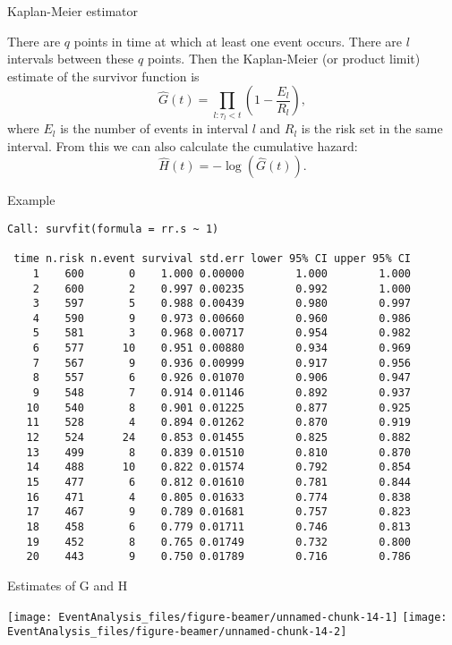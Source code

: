 \documentclass[10pt,ignorenonframetext,]{beamer}
\begin{document}
\begin{frame}{Kaplan-Meier estimator}

There are \(q\) points in time at which at least one event occurs. There
are \(l\) intervals between these \(q\) points. Then the Kaplan-Meier
(or product limit) estimate of the survivor function is \[
\widehat{G}(t) = \prod_{l:\tau_l<t} \left(1 - \frac{E_l}{R_l}\right),
\] where \(E_l\) is the number of events in interval \(l\) and \(R_l\)
is the risk set in the same interval. From this we can also calculate
the cumulative hazard: \[
\widehat{H}(t) = -\log\left(\widehat{G}(t)\right).
\]

\end{frame}

\begin{frame}[fragile]{Example}

\tiny

\begin{verbatim}
Call: survfit(formula = rr.s ~ 1)

 time n.risk n.event survival std.err lower 95% CI upper 95% CI
    1    600       0    1.000 0.00000        1.000        1.000
    2    600       2    0.997 0.00235        0.992        1.000
    3    597       5    0.988 0.00439        0.980        0.997
    4    590       9    0.973 0.00660        0.960        0.986
    5    581       3    0.968 0.00717        0.954        0.982
    6    577      10    0.951 0.00880        0.934        0.969
    7    567       9    0.936 0.00999        0.917        0.956
    8    557       6    0.926 0.01070        0.906        0.947
    9    548       7    0.914 0.01146        0.892        0.937
   10    540       8    0.901 0.01225        0.877        0.925
   11    528       4    0.894 0.01262        0.870        0.919
   12    524      24    0.853 0.01455        0.825        0.882
   13    499       8    0.839 0.01510        0.810        0.870
   14    488      10    0.822 0.01574        0.792        0.854
   15    477       6    0.812 0.01610        0.781        0.844
   16    471       4    0.805 0.01633        0.774        0.838
   17    467       9    0.789 0.01681        0.757        0.823
   18    458       6    0.779 0.01711        0.746        0.813
   19    452       8    0.765 0.01749        0.732        0.800
   20    443       9    0.750 0.01789        0.716        0.786
\end{verbatim}

\end{frame}

\begin{frame}{Estimates of G and H}

\texttt{[image: EventAnalysis\_files/figure-beamer/unnamed-chunk-14-1]}
\texttt{[image: EventAnalysis\_files/figure-beamer/unnamed-chunk-14-2]}

\end{frame}
\end{document}
